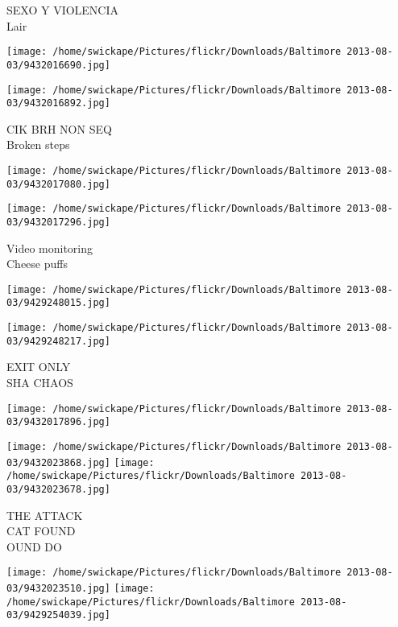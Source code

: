 \documentclass[10pt,letterpaper]{article}
\begin{document}
SEXO Y VIOLENCIA\\
Lair\\
\pagebreak

\texttt{[image: /home/swickape/Pictures/flickr/Downloads/Baltimore 2013-08-03/9432016690.jpg]}

\vspace{0.25in}
\texttt{[image: /home/swickape/Pictures/flickr/Downloads/Baltimore 2013-08-03/9432016892.jpg]}

CIK BRH NON SEQ\\
Broken steps\\
\pagebreak

\texttt{[image: /home/swickape/Pictures/flickr/Downloads/Baltimore 2013-08-03/9432017080.jpg]}

\vspace{0.25in}
\texttt{[image: /home/swickape/Pictures/flickr/Downloads/Baltimore 2013-08-03/9432017296.jpg]}

Video monitoring\\
Cheese puffs\\
\pagebreak

\texttt{[image: /home/swickape/Pictures/flickr/Downloads/Baltimore 2013-08-03/9429248015.jpg]}

\vspace{0.25in}
\texttt{[image: /home/swickape/Pictures/flickr/Downloads/Baltimore 2013-08-03/9429248217.jpg]}

EXIT ONLY\\
SHA CHAOS\\
\pagebreak

\texttt{[image: /home/swickape/Pictures/flickr/Downloads/Baltimore 2013-08-03/9432017896.jpg]}

\vspace{0.25in}
\texttt{[image: /home/swickape/Pictures/flickr/Downloads/Baltimore 2013-08-03/9432023868.jpg]}
\texttt{[image: /home/swickape/Pictures/flickr/Downloads/Baltimore 2013-08-03/9432023678.jpg]}

THE ATTACK\\
CAT FOUND\\
OUND DO\\
\pagebreak

\texttt{[image: /home/swickape/Pictures/flickr/Downloads/Baltimore 2013-08-03/9432023510.jpg]}
\texttt{[image: /home/swickape/Pictures/flickr/Downloads/Baltimore 2013-08-03/9429254039.jpg]}
\end{document}
